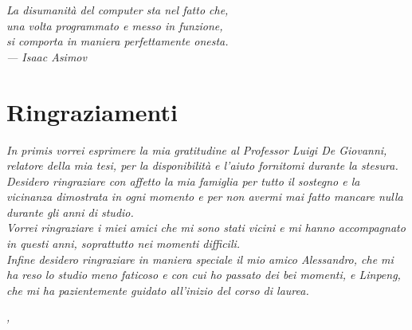 
\cleardoublepage
{}
{}

\begin{flushright}
	{
	\slshape
	La disumanità del computer sta nel fatto che,\\
	una volta programmato e messo in funzione,\\
	si comporta in maniera perfettamente onesta. \\
	\medskip
	--- Isaac Asimov
	}
	\end{flushright}
	
	\bigskip
	
	\begingroup
	\let\clearpage\relax
	\let\cleardoublepage\relax
	\let\cleardoublepage\relax
	
	\chapter*{Ringraziamenti}
	
	\noindent
	\textit{In primis vorrei esprimere la mia gratitudine al
			Professor Luigi De Giovanni, relatore della mia tesi,
			per la disponibilità e l'aiuto fornitomi durante la
			stesura.}\\
	
	\noindent
	\textit{Desidero ringraziare con affetto la mia famiglia
			per tutto il sostegno e la vicinanza dimostrata
			in ogni momento e per non avermi mai fatto mancare
			nulla durante gli anni di studio.}\\
	
	\noindent
	\textit{Vorrei ringraziare i miei amici che mi sono
			stati vicini e mi hanno accompagnato in questi anni,
			soprattutto nei momenti difficili.}\\
	
	\noindent
	\textit{Infine desidero ringraziare in maniera speciale il mio amico
			Alessandro, che mi ha reso lo studio meno faticoso e con cui
			ho passato dei bei momenti, e Linpeng, che mi ha pazientemente
			guidato all'inizio del corso di laurea.}\\
	\bigskip
	
	\noindent\textit{\myLocation, \myTime}
	\begin{flushright}
	\myName
	\end{flushright}
	
	\endgroup

